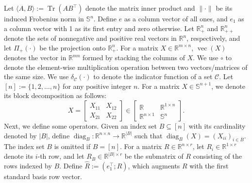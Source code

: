 \documentclass[11pt]{article}
\theoremstyle{plain}
\def\R{\mathbb{R}}
\def\S{\mathbb{S}}
\begin{document}
Let $\langle A, B\rangle := \operatorname{Tr}\left(A B^{\top}\right)$ denote the matrix inner product and $\|\cdot\|$ be its induced Frobenius norm in $\mathbb{S}^n$. Define $e$ as a column vector of all ones, and $e_1$ as a column vector with 1 as its first entry and zero otherwise. 
Let $\R^n_+$ and $\R^n_{++}$ denote the sets of nonnegative and positive real vectors in $\R^n$, respectively, and let $\Pi_+(\cdot)$ be the projection onto $\R^n_+$.
For a matrix $X \in \mathbb{R}^{m \times n}$, $\operatorname{vec}(X)$ denotes the vector in $\mathbb{R}^{mn}$ formed by stacking the columns of $X$. 
We use $\circ$ to denote the element-wise multiplication operation between two vectors/matrices of the same size. 
We use $\delta_{\mathcal{C}}(\cdot)$ to denote the indicator function of a set $\mathcal{C}$. Let $[n] := \{1,2, \ldots, n\}$ for any positive integer $n$. For a matrix $X\in\S^{n+1}$, we denote its block decomposition as follows:
\begin{equation}\label{notation-block}
    X=\begin{bmatrix}
        X_{11}&X_{12}\\
        X_{21}&X_{22}
    \end{bmatrix}\in \begin{bmatrix}
        \mathbb{R}&\mathbb{R}^{1\times n}\\
        \mathbb{R}^{n\times 1}&\S^{n}
    \end{bmatrix}.
\end{equation}
Next, we define some operators. Given an index set $B \subseteq[n]$ with its cardinality denoted by $|B|$, define $\operatorname{diag}_B: \mathbb{R}^{n \times n} \rightarrow \mathbb{R}^{|B|}$ such that $\operatorname{diag}_B(X)=\left(X_{ii}\right)_{i \in B}$. 
The index set $B$ is omitted if $B=[n]$. 
For a matrix $R \in \mathbb{R}^{n \times r}$, let $R_i\in\R^{1\times r}$ denote its $i$-th row, and let $R_B \in \mathbb{R}^{|B| \times r}$ be the submatrix of $R$ consisting of the rows indexed by $B$. Define $\widehat R:= (e^\top_1;R)$, which augments $R$ with the first standard basis row vector.




















\end{document}
